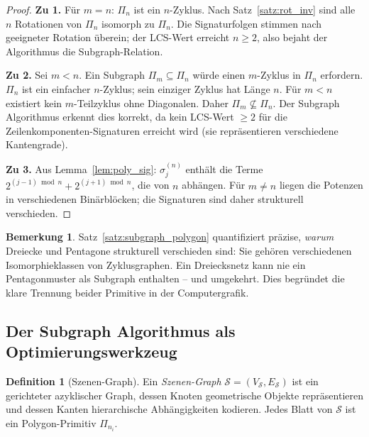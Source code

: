 ﻿\documentclass[a4paper,12pt]{article}
\theoremstyle{definition}
\newtheorem{definition}{Definition}[section]
\newtheorem{bemerkung}{Bemerkung}[section]
\begin{document}
\begin{proof}
\textbf{Zu 1.} F\"ur $m = n$: $\Pi_n$ ist ein $n$-Zyklus. Nach
Satz~\ref{satz:rot_inv} sind alle $n$ Rotationen von $\Pi_n$ isomorph zu
$\Pi_n$. Die Signaturfolgen stimmen nach geeigneter Rotation \"uberein;
der LCS-Wert erreicht $n \geq 2$, also bejaht der Algorithmus die
Subgraph-Relation.

\textbf{Zu 2.} Sei $m < n$. Ein Subgraph $\Pi_m \subseteq \Pi_n$ w\"urde
einen $m$-Zyklus in $\Pi_n$ erfordern. $\Pi_n$ ist ein einfacher $n$-Zyklus;
sein einziger Zyklus hat L\"ange $n$. F\"ur $m < n$ existiert kein
$m$-Teilzyklus ohne Diagonalen. Daher $\Pi_m \not\subseteq \Pi_n$.
Der Subgraph Algorithmus erkennt dies korrekt, da kein LCS-Wert $\geq 2$
f\"ur die Zeilenkomponenten-Signaturen erreicht wird (sie repr\"asentieren
verschiedene Kantengrade).

\textbf{Zu 3.} Aus Lemma~\ref{lem:poly_sig}: $\sigma_j^{(n)}$ enth\"alt
die Terme $2^{(j-1)\bmod n} + 2^{(j+1)\bmod n}$, die von $n$ abh\"angen.
F\"ur $m \neq n$ liegen die Potenzen in verschiedenen Bin\"arbl\"ocken;
die Signaturen sind daher strukturell verschieden.
\end{proof}

\begin{bemerkung}
Satz~\ref{satz:subgraph_polygon} quantifiziert pr\"azise, \emph{warum}
Dreiecke und Pentagone strukturell verschieden sind: Sie geh\"oren
verschiedenen Isomorphieklassen von Zyklusgraphen. Ein Dreiecksnetz kann
nie ein Pentagonmuster als Subgraph enthalten -- und umgekehrt. Dies
begr\"undet die klare Trennung beider Primitive in der Computergrafik.
\end{bemerkung}

\subsection{Der Subgraph Algorithmus als Optimierungswerkzeug}

\begin{definition}[Szenen-Graph]
\label{def:scene_graph}
Ein \emph{Szenen-Graph} $\mathcal{S} = (V_\mathcal{S}, E_\mathcal{S})$
ist ein gerichteter azyklischer Graph, dessen Knoten geometrische Objekte
repr\"asentieren und dessen Kanten hierarchische Abh\"angigkeiten kodieren.
Jedes Blatt von $\mathcal{S}$ ist ein Polygon-Primitiv $\Pi_{n_i}$.
\end{definition}
\end{document}
